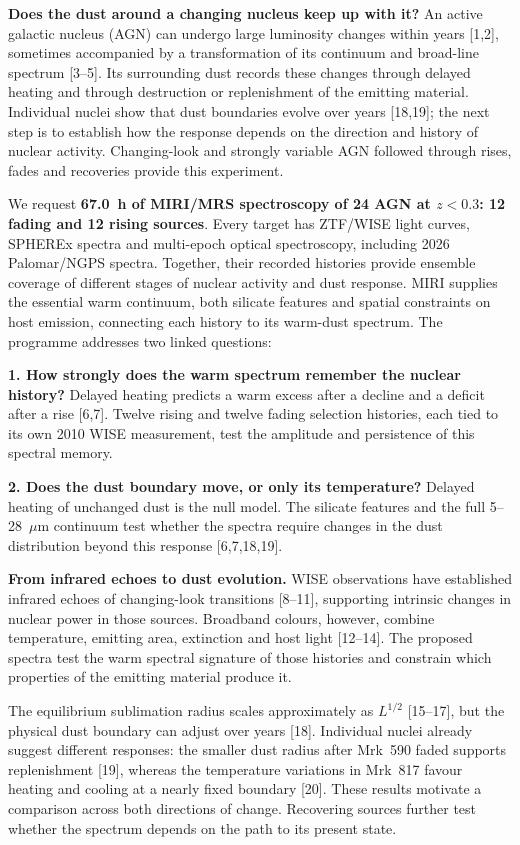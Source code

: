 \documentclass[12pt]{article}
\begin{document}
\scientificjustification

\noindent\textbf{Does the dust around a changing nucleus keep up with it?}
An active galactic nucleus (AGN) can undergo large luminosity changes within years [1,2], sometimes accompanied by a transformation of its continuum and broad-line spectrum [3--5]. Its surrounding dust records these changes through delayed heating and through destruction or replenishment of the emitting material. Individual nuclei show that dust boundaries evolve over years [18,19]; the next step is to establish how the response depends on the direction and history of nuclear activity. Changing-look and strongly variable AGN followed through rises, fades and recoveries provide this experiment.

We request \textbf{67.0~h of MIRI/MRS spectroscopy of 24 AGN at $z<0.3$: 12 fading and 12 rising sources}. Every target has ZTF/WISE light curves, SPHEREx spectra and multi-epoch optical spectroscopy, including 2026 Palomar/NGPS spectra. Together, their recorded histories provide ensemble coverage of different stages of nuclear activity and dust response. MIRI supplies the essential warm continuum, both silicate features and spatial constraints on host emission, connecting each history to its warm-dust spectrum. The programme addresses two linked questions:

\noindent\textbf{1. How strongly does the warm spectrum remember the nuclear history?} Delayed heating predicts a warm excess after a decline and a deficit after a rise [6,7]. Twelve rising and twelve fading selection histories, each tied to its own 2010 WISE measurement, test the amplitude and persistence of this spectral memory.

\noindent\textbf{2. Does the dust boundary move, or only its temperature?} Delayed heating of unchanged dust is the null model. The silicate features and the full 5--28~$\mu$m continuum test whether the spectra require changes in the dust distribution beyond this response [6,7,18,19].

\noindent\textbf{From infrared echoes to dust evolution.}
WISE observations have established infrared echoes of changing-look transitions [8--11], supporting intrinsic changes in nuclear power in those sources. Broadband colours, however, combine temperature, emitting area, extinction and host light [12--14]. The proposed spectra test the warm spectral signature of those histories and constrain which properties of the emitting material produce it.

The equilibrium sublimation radius scales approximately as $L^{1/2}$ [15--17], but the physical dust boundary can adjust over years [18]. Individual nuclei already suggest different responses: the smaller dust radius after Mrk~590 faded supports replenishment [19], whereas the temperature variations in Mrk~817 favour heating and cooling at a nearly fixed boundary [20]. These results motivate a comparison across both directions of change. Recovering sources further test whether the spectrum depends on the path to its present state.
\end{document}
